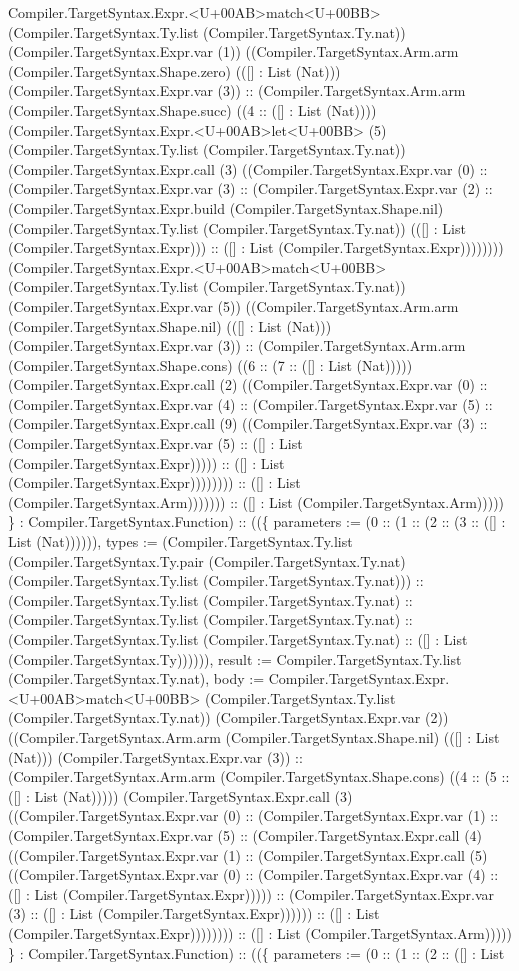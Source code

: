\documentclass[11pt]{article}
\begin{document}
Compiler.TargetSyntax.Expr.<U+00AB>match<U+00BB> (Compiler.TargetSyntax.Ty.list (Compiler.TargetSyntax.Ty.nat)) (Compiler.TargetSyntax.Expr.var (1)) ((Compiler.TargetSyntax.Arm.arm (Compiler.TargetSyntax.Shape.zero) (([] : List (Nat))) (Compiler.TargetSyntax.Expr.var (3)) :: (Compiler.TargetSyntax.Arm.arm (Compiler.TargetSyntax.Shape.succ) ((4 :: ([] : List (Nat)))) (Compiler.TargetSyntax.Expr.<U+00AB>let<U+00BB> (5) (Compiler.TargetSyntax.Ty.list (Compiler.TargetSyntax.Ty.nat)) (Compiler.TargetSyntax.Expr.call (3) ((Compiler.TargetSyntax.Expr.var (0) :: (Compiler.TargetSyntax.Expr.var (3) :: (Compiler.TargetSyntax.Expr.var (2) :: (Compiler.TargetSyntax.Expr.build (Compiler.TargetSyntax.Shape.nil) (Compiler.TargetSyntax.Ty.list (Compiler.TargetSyntax.Ty.nat)) (([] : List (Compiler.TargetSyntax.Expr))) :: ([] : List (Compiler.TargetSyntax.Expr)))))))) (Compiler.TargetSyntax.Expr.<U+00AB>match<U+00BB> (Compiler.TargetSyntax.Ty.list (Compiler.TargetSyntax.Ty.nat)) (Compiler.TargetSyntax.Expr.var (5)) ((Compiler.TargetSyntax.Arm.arm (Compiler.TargetSyntax.Shape.nil) (([] : List (Nat))) (Compiler.TargetSyntax.Expr.var (3)) :: (Compiler.TargetSyntax.Arm.arm (Compiler.TargetSyntax.Shape.cons) ((6 :: (7 :: ([] : List (Nat))))) (Compiler.TargetSyntax.Expr.call (2) ((Compiler.TargetSyntax.Expr.var (0) :: (Compiler.TargetSyntax.Expr.var (4) :: (Compiler.TargetSyntax.Expr.var (5) :: (Compiler.TargetSyntax.Expr.call (9) ((Compiler.TargetSyntax.Expr.var (3) :: (Compiler.TargetSyntax.Expr.var (5) :: ([] : List (Compiler.TargetSyntax.Expr))))) :: ([] : List (Compiler.TargetSyntax.Expr)))))))) :: ([] : List (Compiler.TargetSyntax.Arm))))))) :: ([] : List (Compiler.TargetSyntax.Arm))))) \} : Compiler.TargetSyntax.Function) :: ((\{ parameters := (0 :: (1 :: (2 :: (3 :: ([] : List (Nat)))))), types := (Compiler.TargetSyntax.Ty.list (Compiler.TargetSyntax.Ty.pair (Compiler.TargetSyntax.Ty.nat) (Compiler.TargetSyntax.Ty.list (Compiler.TargetSyntax.Ty.nat))) :: (Compiler.TargetSyntax.Ty.list (Compiler.TargetSyntax.Ty.nat) :: (Compiler.TargetSyntax.Ty.list (Compiler.TargetSyntax.Ty.nat) :: (Compiler.TargetSyntax.Ty.list (Compiler.TargetSyntax.Ty.nat) :: ([] : List (Compiler.TargetSyntax.Ty)))))), result := Compiler.TargetSyntax.Ty.list (Compiler.TargetSyntax.Ty.nat), body := Compiler.TargetSyntax.Expr.<U+00AB>match<U+00BB> (Compiler.TargetSyntax.Ty.list (Compiler.TargetSyntax.Ty.nat)) (Compiler.TargetSyntax.Expr.var (2)) ((Compiler.TargetSyntax.Arm.arm (Compiler.TargetSyntax.Shape.nil) (([] : List (Nat))) (Compiler.TargetSyntax.Expr.var (3)) :: (Compiler.TargetSyntax.Arm.arm (Compiler.TargetSyntax.Shape.cons) ((4 :: (5 :: ([] : List (Nat))))) (Compiler.TargetSyntax.Expr.call (3) ((Compiler.TargetSyntax.Expr.var (0) :: (Compiler.TargetSyntax.Expr.var (1) :: (Compiler.TargetSyntax.Expr.var (5) :: (Compiler.TargetSyntax.Expr.call (4) ((Compiler.TargetSyntax.Expr.var (1) :: (Compiler.TargetSyntax.Expr.call (5) ((Compiler.TargetSyntax.Expr.var (0) :: (Compiler.TargetSyntax.Expr.var (4) :: ([] : List (Compiler.TargetSyntax.Expr))))) :: (Compiler.TargetSyntax.Expr.var (3) :: ([] : List (Compiler.TargetSyntax.Expr)))))) :: ([] : List (Compiler.TargetSyntax.Expr)))))))) :: ([] : List (Compiler.TargetSyntax.Arm))))) \} : Compiler.TargetSyntax.Function) :: ((\{ parameters := (0 :: (1 :: (2 :: ([] : List 
\end{document}
